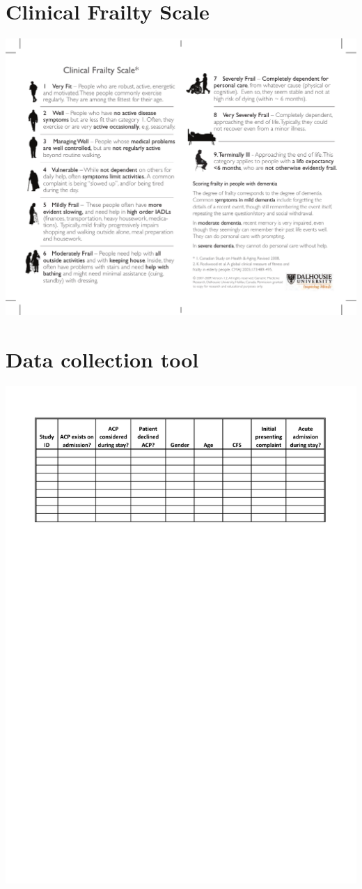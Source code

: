 \documentclass
[
	12pt,
	a4paper,
	oneside,
]{article}
\begin{document}
\clearpage
\begin{appendix}

\section{Clinical Frailty Scale}
\label{appendix:CFS}
\includegraphics[width=\textwidth]{CFS}

\section{Data collection tool}
\label{appendix:tool}
\includegraphics[width=\textwidth]{dataCollection}


\end{appendix}
\end{document}

